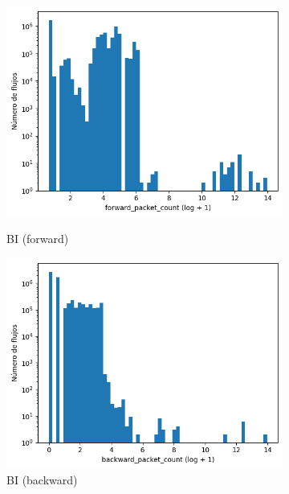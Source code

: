 \begin{figure}[H]
\begin{subfigure}[b]{0.26\textwidth}
        \includegraphics[width=\textwidth]{media/packet_pincer_botiot/forward_packet_count_log_x_log_y.png}
        \caption{BI (forward)}
        \includegraphics[width=\textwidth]{media/packet_pincer_botiot/backward_packet_count_log_x_log_y.png}
        \caption{BI (backward)}
    \end{subfigure}
    \hfill
    \begin{subfigure}[b]{0.26\textwidth}
        \centering

\end{subfigure}
\end{figure}
